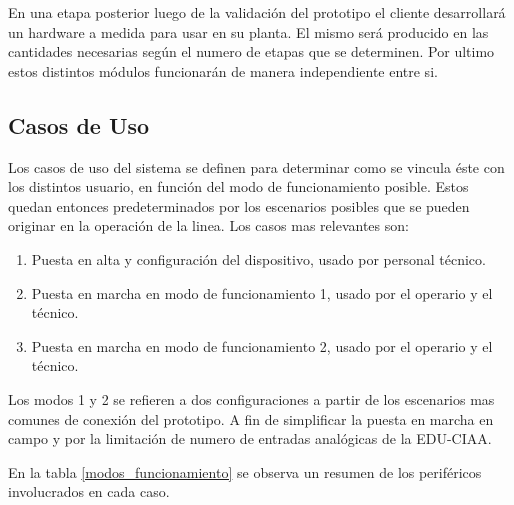 En una etapa posterior luego de la validación del prototipo el cliente desarrollará un hardware a medida para usar en su planta. El mismo será producido en las cantidades necesarias según el numero de etapas que se determinen. Por ultimo estos distintos módulos funcionarán de manera independiente entre si.



\subsection{ Casos de Uso }
\label{subsec:casos_de_uso}
Los casos de uso del sistema se definen para determinar como se vincula éste con los distintos usuario, en función del modo de funcionamiento posible. Estos quedan entonces predeterminados por los escenarios posibles que se pueden originar en la operación de la linea. Los casos mas relevantes son:

\begin{enumerate}
	\item Puesta en alta y configuración del dispositivo, usado por personal técnico.
	\item Puesta en marcha en modo de funcionamiento 1, usado por el operario y el técnico.
	\item Puesta en marcha en modo de funcionamiento 2, usado por el operario y el técnico.
\end{enumerate}

Los modos 1 y 2 se refieren a dos configuraciones a partir de los escenarios mas comunes de conexión del prototipo. A fin de simplificar la puesta en marcha en campo y por la limitación de numero de entradas analógicas de la EDU-CIAA.

En la tabla \ref{modos_funcionamiento} se observa un resumen de los periféricos involucrados en cada caso.

